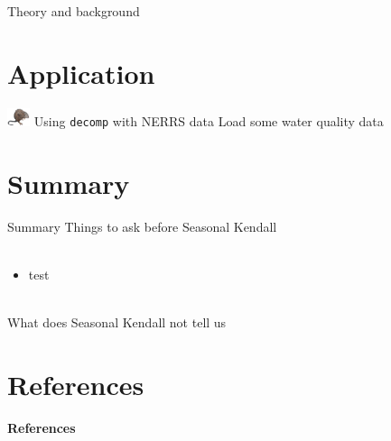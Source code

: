 \documentclass[xcolor=dvipsnames,serif]{beamer}\usepackage[]{graphicx}\usepackage[]{color}
\newcommand{\Bigtxt}[1]{\textbf{\textit{#1}}}
\begin{document}
\begin{frame}[t]{Theory and background}{}

\end{frame}

\section{Application}

\begin{frame}[fragile]{\includegraphics[width = 0.05\textwidth]{imgs/swmprat.png} Using \texttt{decomp} with NERRS data}
Load some water quality data

\end{frame}

\section{Summary}

\begin{frame}{Summary}{}
Things to ask before Seasonal Kendall \\~\\
\begin{itemize}
\item test \\~\\
\end{itemize}
What does Seasonal Kendall not tell us
\end{frame}


\section{References}
\begin{frame}[t]{\textbf{References}}
\tiny
{}


\end{frame}
\end{document}

